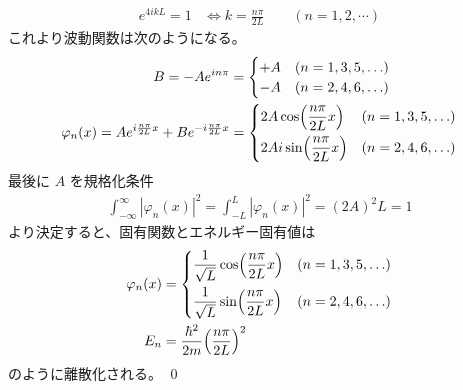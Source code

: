 \documentclass[uplatex,dvipdfmx,a4paper,11pt]{jlreq}
\makeatletter
\numberwithin{equation}{section}
\theoremstyle{definition}
\renewenvironment{proof}[1][\proofname]{\par
  \normalfont
  \topsep6\p@\@plus6\p@ \trivlist
  \item[\hskip\labelsep{\bfseries #1}\@addpunct{\bfseries}]\ignorespaces\quad\par
}{%
  \qed\endtrivlist\@endpefalse
}
\renewcommand\proofname{証明}
\makeatother
\begin{document}
\begin{proof}
\begin{align}
    e^{4ikL} = 1 & \iff k = \frac{n\pi}{2L} \qquad (n = 1,2,\cdots)
  \end{align}
  これより波動関数は次のようになる。
  \begin{align}
    B = - Ae^{in\pi}                                                & = \begin{cases}
                                                                          +A & (n = 1,3,5,\ldots) \\
                                                                          -A & (n = 2,4,6,\ldots)
                                                                        \end{cases}                        \\
    \varphi_n(x) = Ae^{i\frac{n\pi}{2L}x} + Be^{-i\frac{n\pi}{2L}x} & = \begin{dcases}
                                                                          2A\cos(\frac{n\pi}{2L}x)  & (n = 1,3,5,\ldots) \\
                                                                          2Ai\sin(\frac{n\pi}{2L}x) & (n = 2,4,6,\ldots)
                                                                        \end{dcases}
  \end{align}
  最後に $A$ を規格化条件
  \begin{align}
    \int_{-\infty}^\infty |\varphi_n(x)|^2 = \int_{-L}^L |\varphi_n(x)|^2 = (2A)^2L = 1
  \end{align}
  より決定すると、固有関数とエネルギー固有値は
  \begin{align}
    \varphi_n(x) & = \begin{dcases}
                       \frac{1}{\sqrt{L}}\cos(\frac{n\pi}{2L}x) & (n = 1,3,5,\ldots) \\
                       \frac{1}{\sqrt{L}}\sin(\frac{n\pi}{2L}x) & (n = 2,4,6,\ldots)
                     \end{dcases} \\
    E_n          & = \frac{\hbar^2}{2m}\qty(\frac{n\pi}{2L})^2
  \end{align}
  のように離散化される。
\end{proof}
\end{document}
